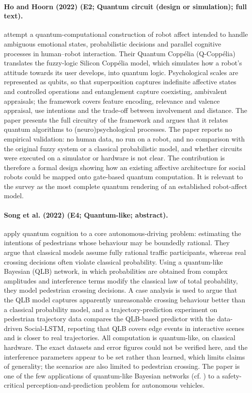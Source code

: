 \documentclass[10pt,a4paper]{article}
\begin{document}
\paragraph{Ho and Hoorn (2022) (E2; Quantum circuit (design or simulation); full text).} \citet{Ho2022} attempt a quantum-computational construction of robot affect intended to handle ambiguous emotional states, probabilistic decisions and parallel cognitive processes in human--robot interaction. Their Quantum Coppélia (Q-Coppélia) translates the fuzzy-logic Silicon Coppélia model, which simulates how a robot's attitude towards its user develops, into quantum logic. Psychological scales are represented as qubits, so that superposition captures indefinite affective states and controlled operations and entanglement capture coexisting, ambivalent appraisals; the framework covers feature encoding, relevance and valence appraisal, use intentions and the trade-off between involvement and distance. The paper presents the full circuitry of the framework and argues that it relates quantum algorithms to (neuro)psychological processes. The paper reports no empirical validation: no human data, no run on a robot, and no comparison with the original fuzzy system or a classical probabilistic model, and whether circuits were executed on a simulator or hardware is not clear. The contribution is therefore a formal design showing how an existing affective architecture for social robots could be mapped onto gate-based quantum computation. It is relevant to the survey as the most complete quantum rendering of an established robot-affect model.

\paragraph{Song et al. (2022) (E4; Quantum-like; abstract).} \citet{Song2022} apply quantum cognition to a core autonomous-driving problem: estimating the intentions of pedestrians whose behaviour may be boundedly rational. They argue that classical models assume fully rational traffic participants, whereas real crossing decisions often violate classical probability. Using a quantum-like Bayesian (QLB) network, in which probabilities are obtained from complex amplitudes and interference terms modify the classical law of total probability, they model pedestrian crossing decisions. A case analysis is used to argue that the QLB model captures apparently unreasonable crossing behaviour better than a classical probability model, and a trajectory-prediction experiment on pedestrian trajectory data compares the QLB-based predictor with the data-driven Social-LSTM, reporting that QLB covers edge events in interactive scenes and is closer to real trajectories. All computation is quantum-like, on classical hardware. The exact datasets and error figures could not be verified here, and the interference parameters appear to be set rather than learned, which limits claims of generality; the scenarios are also limited to pedestrian crossing. The paper is one of the few applications of quantum-like Bayesian networks (cf. \citet{Moreira2016}) to a safety-critical perception-and-prediction problem for autonomous vehicles.
\end{document}
